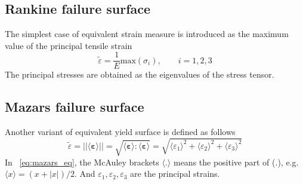 \documentclass[main.tex]{subfiles}
\begin{document}
\subsection{Rankine failure surface}
The simplest case of equivalent strain measure is introduced as the maximum value of the principal tensile strain
\begin{equation}\label{eq:rankine_eq}
\tilde{\varepsilon} = \frac{1}{E} \mathrm{max}(\sigma_i), \qquad i=1,2,3  
\end{equation}
The principal stresses are obtained as the eigenvalues of the stress tensor.

\subsection{Mazars failure surface}
Another variant of equivalent yield surface is defined as follows
\begin{equation}\label{eq:mazars_eq}
\tilde{\varepsilon} = ||\langle
{\boldsymbol{\varepsilon}}
\rangle || = \sqrt{\langle \boldsymbol{\varepsilon} \rangle  : \langle \boldsymbol{\varepsilon} \rangle} = \sqrt{ {\langle \varepsilon_1\rangle}^2   + {\langle\varepsilon_2 \rangle}^2 + {\langle\varepsilon_3 \rangle}^2}
\end{equation}
In ~\ref{eq:mazars_eq}, the McAuley brackets $\langle . \rangle$ means the positive part of (.), e.g. $\langle x \rangle = (x+|x|)/2$. And $\varepsilon_1, \varepsilon_2, \varepsilon_3$ are the principal strains.
\end{document}
